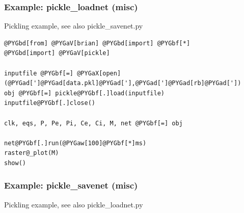 \documentclass[letterpaper,10pt,english]{manual}
\begin{document}
\resetcurrentobjects
\hypertarget{--doc-examples-misc_pickle_loadnet}{}

\hypertarget{index-76}{}\subsubsection{Example: pickle\_loadnet (misc)}

Pickling example, see also pickle\_savenet.py

\begin{Verbatim}[commandchars=@\[\]]
@PYGbd[from] @PYGaV[brian] @PYGbd[import] @PYGbf[*]
@PYGbd[import] @PYGaV[pickle]

inputfile @PYGbf[=] @PYGaX[open](@PYGad[']@PYGad[data.pkl]@PYGad['],@PYGad[']@PYGad[rb]@PYGad['])
obj @PYGbf[=] pickle@PYGbf[.]load(inputfile)
inputfile@PYGbf[.]close()

clk, eqs, P, Pe, Pi, Ce, Ci, M, net @PYGbf[=] obj

net@PYGbf[.]run(@PYGaw[100]@PYGbf[*]ms)
raster@_plot(M)
show()
\end{Verbatim}

\resetcurrentobjects
\hypertarget{--doc-examples-misc_pickle_savenet}{}

\hypertarget{index-77}{}\subsubsection{Example: pickle\_savenet (misc)}

Pickling example, see also pickle\_loadnet.py
\end{document}
